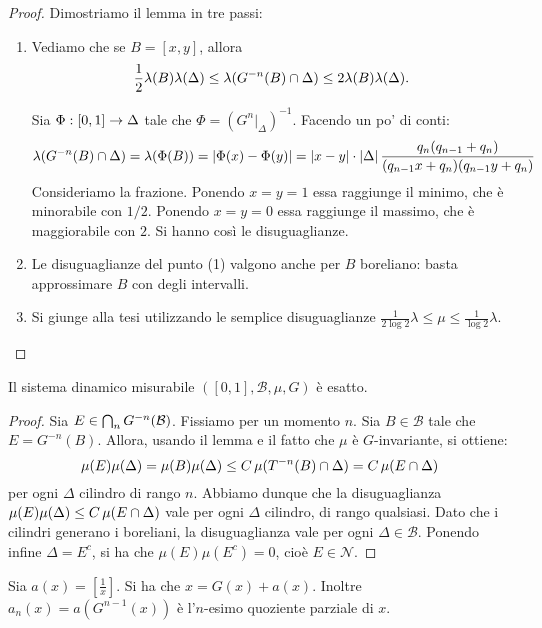 \begin{proof} Dimostriamo il lemma in tre passi: \begin{enumerate}
\item Vediamo che se $B=[x,y]$, allora 
$$\frac{1}{2}\lambda(B)\lambda(\Delta)\leq \lambda(G^{-n}(B)\cap\Delta)\leq 2 \lambda(B)\lambda(\Delta).$$

Sia $\Phi:[0,1]\stackrel{}{\rightarrow} \Delta$ tale che $\Phi=(G^n|_{\Delta})^{-1}$. Facendo un po' di conti:
$$\lambda(G^{-n}(B)\cap\Delta)=\lambda(\Phi(B))=\left|\Phi(x)-\Phi(y)\right|=\left|x-y\right|\cdot \left|\Delta\right|\frac{q_n(q_{n-1}+q_n)}{(q_{n-1}x+q_n)(q_{n-1}y+q_n)}$$
 Consideriamo la frazione. Ponendo $x=y=1$ essa raggiunge il minimo, che \`e minorabile con $1/2$. Ponendo $x=y=0$ essa raggiunge il massimo, che \`e maggiorabile con $2$. Si hanno cos\`i le disuguaglianze.

\item Le disuguaglianze del punto (1) valgono anche per $B$ boreliano: basta approssimare $B$ con degli intervalli.

\item Si giunge alla tesi utilizzando le semplice disuguaglianze $\frac{1}{2\log 2}\lambda\leq\mu\leq\frac{1}{\log 2}\lambda$.

\end{enumerate}
\end{proof}

\begin{prop} Il sistema dinamico misurabile $([0,1],\mathcal{B},\mu,G)$ \`e esatto.\end{prop}

\begin{proof} Sia $E\in\bigcap_n G^{-n}(\mathcal{B})$. Fissiamo per un momento $n$. Sia $B\in\mathcal{B}$ tale che $E=G^{-n}(B)$. Allora, usando il lemma e il fatto che $\mu$ \`e $G$-invariante, si ottiene:
$$\mu(E)\mu(\Delta)=\mu(B)\mu(\Delta)\leq C\,\mu(T^{-n}(B)\cap \Delta)=C\,\mu(E\cap \Delta)$$
per ogni $\Delta$ cilindro di rango $n$.
Abbiamo dunque che la disuguaglianza $\mu(E)\mu(\Delta)\leq C\,\mu(E\cap \Delta)$ vale per ogni $\Delta$ cilindro, di rango qualsiasi. Dato che i cilindri generano i boreliani, la disuguaglianza vale per ogni $\Delta\in\mathcal{B}$. Ponendo infine $\Delta=E^c$, si ha che $\mu(E)\mu(E^c)=0$, cio\`e $E\in\mathcal{N}$.
\end{proof}

Sia $a(x)=\left[\frac{1}{x}\right]$. Si ha che $x=G(x)+a(x)$. Inoltre $a_n(x)=a(G^{n-1}(x))$ \`e l'$n$-esimo quoziente parziale di $x$.

